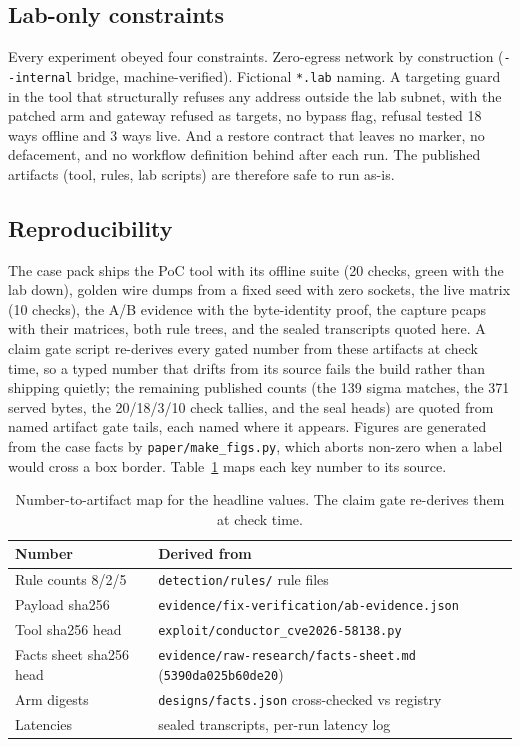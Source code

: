 \documentclass[journal]{IEEEtran}
\begin{document}
\subsection{Lab-only constraints}

Every experiment obeyed four constraints. Zero-egress network by construction
(\texttt{-{}-internal} bridge, machine-verified). Fictional \texttt{*.lab}
naming. A targeting guard in the tool that structurally refuses any address
outside the lab subnet, with the patched arm and gateway refused as targets,
no bypass flag, refusal tested 18 ways offline and 3 ways live. And a restore
contract that leaves no marker, no defacement, and no workflow definition
behind after each run. The published artifacts (tool, rules, lab scripts) are
therefore safe to run as-is.

\subsection{Reproducibility}

The case pack ships the PoC tool with its offline suite (20 checks, green with
the lab down), golden wire dumps from a fixed seed with zero sockets, the live
matrix (10 checks), the A/B evidence with the byte-identity proof, the capture
pcaps with their matrices, both rule trees, and the sealed transcripts quoted
here. A claim gate script re-derives every gated number from these
artifacts at check time, so a typed number that drifts from its source fails
the build rather than shipping quietly; the remaining published counts
(the 139 sigma matches, the 371 served bytes, the 20/18/3/10 check tallies,
and the seal heads) are quoted from named artifact gate tails, each named
where it appears. Figures are generated from the case
facts by \texttt{paper/make\_figs.py}, which aborts non-zero when a label
would cross a box border. Table~\ref{tab:artifacts} maps each key number to
its source.

\begin{table}[t]
\centering
\caption{Number-to-artifact map for the headline values. The claim gate
re-derives them at check time.}
\label{tab:artifacts}
\footnotesize
\begin{tabular}{@{}p{2.75cm}p{4.9cm}@{}}
\toprule
Number & Derived from \\
\midrule
Rule counts 8/2/5 & \texttt{detection/rules/} rule files \\
Payload sha256 & \texttt{evidence/fix-verification/\allowbreak ab-evidence.json} \\
Tool sha256 head & \texttt{exploit/\allowbreak conductor\_\allowbreak cve2026-58138.py} \\
Facts sheet sha256 head & \texttt{evidence/raw-research/}\allowbreak\texttt{facts-sheet.md} (\texttt{5390da025b60de20}) \\
Arm digests & \texttt{designs/facts.json} cross-checked vs registry \\
Latencies & sealed transcripts, per-run latency log \\
\bottomrule
\end{tabular}
\end{table}
\end{document}

